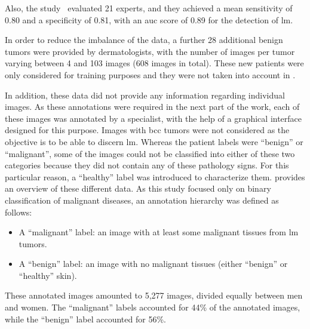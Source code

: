 \documentclass[journal,article,accept,moreauthors,pdftex, applsci]{Definitions/mdpi}
\begin{document}
\newpage
Also, the study~\cite{Cinotti2018} evaluated 21 experts, and they achieved a mean sensitivity of 0.80 and a specificity of 0.81, with an \ac{auc} score of 0.89 for the detection of \ac{lm}.\par
In order to reduce the imbalance of the data, a further 28 additional benign tumors were provided by dermatologists, with the number of images per tumor varying between 4 and 103 images (608 images in total). These new patients were only considered for training purposes and they were not taken into account in .\par
In addition, these data did not provide any information regarding individual images. As these annotations were required in the next part of the work, each of these images was annotated by a specialist, with the help of a graphical interface designed for this purpose. Images with \ac{bcc} tumors were not considered as the objective is to be able to discern \ac{lm}. Whereas the patient labels were “benign” or “malignant”, some of the images could not be classified into either of these two categories because they did not contain any of these pathology signs. For this particular reason, a “healthy” label was introduced to characterize them.  provides an overview of these different data. As this study focused only on binary classification of malignant diseases, an annotation hierarchy was defined as follows:
\begin{itemize}
\item A “malignant” label: an image with at least some malignant tissues from \ac{lm} tumors.
\item A “benign” label: an image with no malignant tissues (either “benign” or “healthy” skin).
\end{itemize}
These annotated images amounted to 5,277 images, divided equally between men and women. The “malignant” labels accounted for 44\% of the annotated images, while the “benign” label accounted for 56\%.\par

\end{document}
